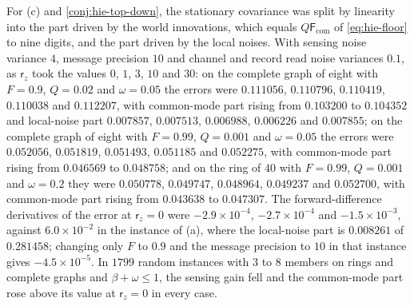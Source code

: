 \begin{numcheck}
For (c) and \cref{conj:hie-top-down}, the stationary covariance was split by linearity into the part driven by the world innovations, which equals $Q\mathsf F_{\mathrm{com}}$ of \eqref{eq:hie-floor} to nine digits, and the part driven by the local noises. With sensing noise variance $4$, message precision $10$ and channel and record read noise variances $0.1$, as $\mathsf r_z$ took the values $0$, $1$, $3$, $10$ and $30$: on the complete graph of eight with $F=0.9$, $Q=0.02$ and $\omega=0.05$ the errors were $0.111056$, $0.110796$, $0.110419$, $0.110038$ and $0.112207$, with common-mode part rising from $0.103200$ to $0.104352$ and local-noise part $0.007857$, $0.007513$, $0.006988$, $0.006226$ and $0.007855$; on the complete graph of eight with $F=0.99$, $Q=0.001$ and $\omega=0.05$ the errors were $0.052056$, $0.051819$, $0.051493$, $0.051185$ and $0.052275$, with common-mode part rising from $0.046569$ to $0.048758$; and on the ring of $40$ with $F=0.99$, $Q=0.001$ and $\omega=0.2$ they were $0.050778$, $0.049747$, $0.048964$, $0.049237$ and $0.052700$, with common-mode part rising from $0.043638$ to $0.047307$. The forward-difference derivatives of the error at $\mathsf r_z=0$ were $-2.9\times10^{-4}$, $-2.7\times10^{-4}$ and $-1.5\times10^{-3}$, against $6.0\times10^{-2}$ in the instance of (a), where the local-noise part is $0.008261$ of $0.281458$; changing only $F$ to $0.9$ and the message precision to $10$ in that instance gives $-4.5\times10^{-5}$. In $1799$ random instances with $3$ to $8$ members on rings and complete graphs and $\beta+\omega\le1$, the sensing gain fell and the common-mode part rose above its value at $\mathsf r_z=0$ in every case.
\end{numcheck}

